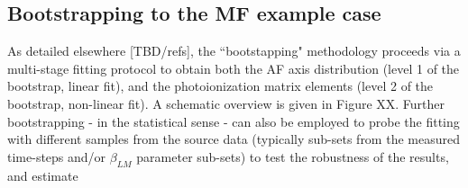 \subsection{Bootstrapping to the MF example case}

As detailed elsewhere [TBD/refs], the ``bootstapping" methodology proceeds via a multi-stage fitting protocol to obtain both the AF axis distribution (level 1 of the bootstrap, linear fit), and the photoionization matrix elements (level 2 of the bootstrap, non-linear fit). A schematic overview is given in Figure XX. Further bootstrapping - in the statistical sense - can also be employed to probe the fitting with different samples from the source data (typically sub-sets from the measured time-steps and/or $\beta_{LM}$ parameter sub-sets) to test the robustness of the results, and estimate 